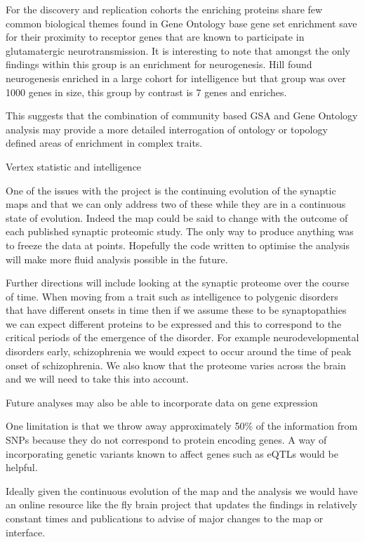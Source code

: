 For the discovery and replication cohorts the enriching proteins share few common biological themes found in Gene Ontology base gene set enrichment save for their proximity to receptor genes that are known to participate in glutamatergic neurotransmission. It is interesting to note that amongst the only findings within this group is an enrichment for neurogenesis. Hill found neurogenesis enriched in a large cohort for intelligence but that group was over 1000 genes in size, this group by contrast is 7 genes and enriches. 



This suggests that the combination of community based GSA and Gene Ontology analysis may provide a more detailed interrogation of ontology or topology defined areas of enrichment in complex traits. 


Vertex statistic and intelligence





One of the issues with the project is the continuing evolution of the synaptic maps and that we can only address two of these while they are in a continuous state of evolution. Indeed the map could be said to change with the outcome of each published synaptic proteomic study. The only way to produce anything was to freeze the data at points. Hopefully the code written to optimise the analysis will make more fluid analysis possible in the future.

Further directions will include looking at the synaptic proteome over the course of time. When moving from a trait such as intelligence to polygenic disorders that have different onsets in time then if we assume these to be synaptopathies we can expect different proteins to be expressed and this to correspond to the critical periods of the emergence of the disorder. For example neurodevelopmental disorders early, schizophrenia we would expect to occur around the time of peak onset of schizophrenia. We also know that the proteome varies across the brain and we will need to take this into account.

Future analyses may also be able to incorporate data on gene expression

One limitation is that we throw away approximately 50\% of the information from SNPs because they do not correspond to protein encoding genes. A way of incorporating genetic variants known to affect genes such as eQTLs would be helpful. 

Ideally given the continuous evolution of the map and the analysis we would have an online resource like the fly brain project that updates the findings in relatively constant times and publications to advise of major changes to the map or interface. 

